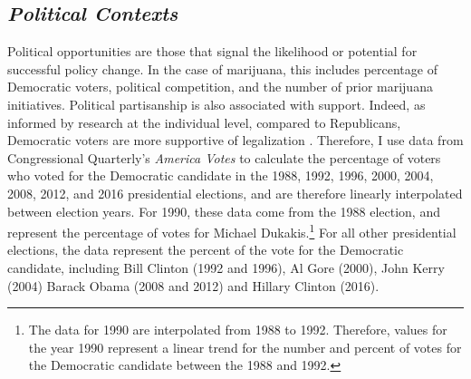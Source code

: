 

%

\subsection{\it{Political Contexts}}

Political opportunities are those that signal the likelihood or potential for successful policy change. In the case of marijuana, this includes percentage of Democratic voters, political competition, and the number of prior marijuana initiatives. Political partisanship is also associated with support. Indeed, as informed by research at the individual level, compared to Republicans, Democratic voters are more supportive of legalization \citep{rosenthal_and_kubby_1996,caulkins_et_al_2012}. Therefore, I use data from Congressional Quarterly's {\it{America Votes}} to calculate the percentage of voters who voted for the Democratic candidate in the 1988, 1992, 1996, 2000, 2004, 2008, 2012, and 2016 presidential elections, and are therefore linearly interpolated between election years. For 1990, these data come from the 1988 election, and represent the percentage of votes for Michael Dukakis.\footnote{The data for 1990 are interpolated from 1988 to 1992. Therefore, values for the year 1990 represent a linear trend for the number and percent of votes for the Democratic candidate between the 1988 and 1992.} For all other presidential elections, the data represent the percent of the vote for the Democratic candidate, including Bill Clinton (1992 and 1996), Al Gore (2000), John Kerry (2004) Barack Obama (2008 and 2012) and Hillary Clinton (2016). 


